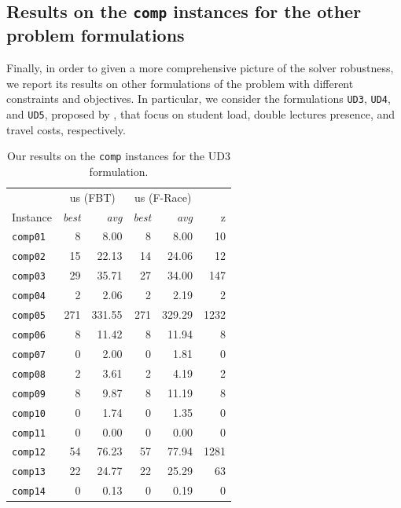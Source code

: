 \documentclass[authoryear,12pt]{article}
\begin{document}
\subsection{Results on the \texttt{comp} instances for the other problem formulations}
\label{sec:other-formulations}

Finally, in order to given a more comprehensive picture of the solver
robustness, we report its results on other formulations of the problem with
different constraints and objectives. In particular, we consider the
formulations \texttt{UD3}, \texttt{UD4}, and \texttt{UD5}, proposed by
\citet{BDDS12}, that focus on student load, double lectures presence, and travel
costs, respectively.

\begin{table}[htdp]
   \begin{scriptsize}
         \caption{Our results on the \texttt{comp} instances for the UD3 formulation.}
      \label{tab:results-UD3}
    \begin{center}
      \begin{tabular}{l|rr|rr|r}
        \toprule
        & \multicolumn{2}{c|}{us (FBT)}   & \multicolumn{2}{c|}{us (F-Race)}   & \multicolumn{1}{c}{\citet{MSTIS13}}    \\
        Instance &  \emph{best} & \emph{avg} & \emph{best} & \emph{avg} & z \\
        \midrule
\texttt{comp01} & 8 & 8.00 & 8 & 8.00 & 10 \\
\texttt{comp02} & 15 & 22.13 & 14 & 24.06 & 12 \\
\texttt{comp03} & 29 & 35.71 & 27 & 34.00 & 147 \\
\texttt{comp04} & 2 & 2.06 & 2 & 2.19 & 2 \\
\texttt{comp05} & 271 & 331.55 & 271 & 329.29 & 1232 \\
\texttt{comp06} & 8 & 11.42 & 8 & 11.94 & 8 \\
\texttt{comp07} & 0 & 2.00 & 0 & 1.81 & 0 \\
\texttt{comp08} & 2 & 3.61 & 2 & 4.19 & 2 \\
\texttt{comp09} & 8 & 9.87 & 8 & 11.19 & 8 \\
\texttt{comp10} & 0 & 1.74 & 0 & 1.35 & 0 \\
\texttt{comp11} & 0 & 0.00 & 0 & 0.00 & 0 \\
\texttt{comp12} & 54 & 76.23 & 57 & 77.94 & 1281 \\
\texttt{comp13} & 22 & 24.77 & 22 & 25.29 & 63 \\
\texttt{comp14} & 0 & 0.13 & 0 & 0.19 & 0 \\

\end{tabular}
\end{center}
\end{scriptsize}
\end{table}
\end{document}
